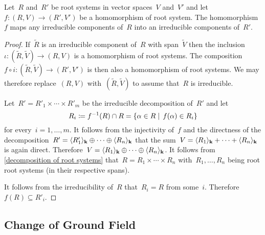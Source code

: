\begin{corollary}
  Let~$R$ and~$R'$ be root systems in vector spaces~$V$ and~$V'$ and let~$f \colon (R,V) \to (R', V')$ be a homomorphism of root system.
  The homomorphism~$f$ maps any irreducible components of~$R$ into an irreducible components of~$R'$.
\end{corollary}


\begin{proof}
  If~$\tilde{R}$ is an irreducible component of~$R$ with span~$\tilde{V}$ then the inclusion~$\iota \colon (\tilde{R}, \tilde{V}) \to (R,V)$ is a homomorphism of root systems.
  The composition~$f \circ i \colon (\tilde{R}, \tilde{V}) \to (R', V')$ is then also a homomorphism of root systems.
  We may therefore replace~$(R,V)$ with~$(\tilde{R}, \tilde{V})$ to assume that~$R$ is irreducible.
  
  Let~$R' = R'_1 \times \dotsb \times R'_m$ be the irreducible decomposition of~$R'$ and let
  \[
    R_i
    \defined
    f^{-1}(R) \cap R
    =
    \{
      \alpha \in R
    \suchthat
      \spacing f(\alpha) \in R_i
    \}
  \]
  for every~$i = 1, \dotsc, m$.
  It follows from the injectivity of~$f$ and the directness of the decomposition~$R' = \langle R'_1\rangle_{\mathbf{k}} \oplus \dotsb \oplus \langle R_n\rangle_{\mathbf{k}}$ that the sum~$V = \langle R_1\rangle_{\mathbf{k}} + \dotsb + \langle R_n\rangle_{\mathbf{k}}$ is again direct.
  Therefore~$V = \langle R_1\rangle_{\mathbf{k}} \oplus \dotsb \oplus \langle R_n\rangle_{\mathbf{k}}$.
  It follows from \cref{decomposition of root systems} that~$R = R_1 \times \dotsb \times R_n$ with~$R_1, \dotsc, R_n$ being root root systems (in their respective spans).
  
  It follows from the irreducibility of~$R$ that~$R_i = R$ from some~$i$.
  Therefore~$f(R) \subseteq R'_i$.
\end{proof}





\subsection{Change of Ground Field}


